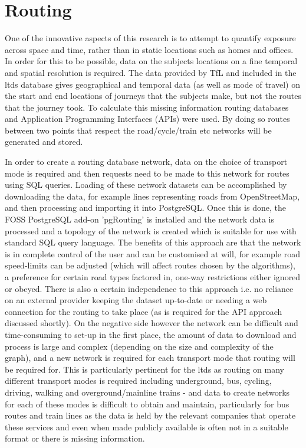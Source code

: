 
\section{Routing}
\label{sec:routing}

One of the innovative aspects of this research is to attempt to quantify exposure across space and time, rather than in static locations such as homes and offices. In order for this to be possible, data on the subjects locations on a fine temporal and spatial resolution is required. The data provided by TfL and included in the \gls{ltds} database gives geographical and temporal data (as well as mode of travel) on the start and end locations of journeys that the subjects make, but not the routes that the journey took. To calculate this missing information routing databases and Application Programming Interfaces (APIs) were used. By doing so routes between two points that respect the road/cycle/train etc networks will be generated and stored. 

In order to create a routing database network, data on the choice of transport mode is required and then requests need to be made to this network for routes using SQL queries.  Loading of these network datasets can be accomplished by downloading the data, for example lines representing roads from OpenStreetMap, and then processing and importing it into PostgreSQL. Once this is done, the FOSS PostgreSQL add-on 'pgRouting' is installed and the network data is processed and a topology of the network is created which is suitable for use with standard SQL query language. The benefits of this approach are that the network is in complete control of the user and can be customised at will, for example road speed-limits can be adjusted (which will affect routes chosen by the algorithms), a preference for certain road types factored in, one-way restrictions either ignored or obeyed. There is also a certain independence to this approach i.e. no reliance on an external provider keeping the dataset up-to-date or needing a web connection for the routing to take place (as is required for the API approach discussed shortly). On the negative side however the network can be difficult and time-consuming to set-up in the first place, the amount of data to download and process is large and complex (depending on the size and complexity of the graph), and a new network is required for each transport mode that routing will be required for. This is particularly pertinent for the \gls{ltds} as routing on many different transport modes is required including underground, bus, cycling, driving, walking and overground/mainline trains - and data to create networks for each of these modes is difficult to obtain and maintain, particularly for bus routes and train lines as the data is held by the relevant companies that operate these services and even when made publicly available is often not in a suitable format or there is missing information.

